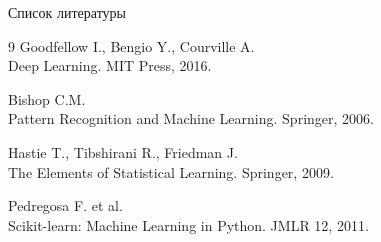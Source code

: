 \documentclass[12pt]{beamer}
\begin{document}
\begin{frame}{Список литературы}
    \begin{thebibliography}{9}
        Goodfellow I., Bengio Y., Courville A.\\
        Deep Learning. MIT Press, 2016.
        
        Bishop C.M.\\
        Pattern Recognition and Machine Learning. Springer, 2006.
        
        Hastie T., Tibshirani R., Friedman J.\\
        The Elements of Statistical Learning. Springer, 2009.
        
        Pedregosa F. et al.\\
        Scikit-learn: Machine Learning in Python. JMLR 12, 2011.
    \end{thebibliography}
\end{frame}
\end{document}

